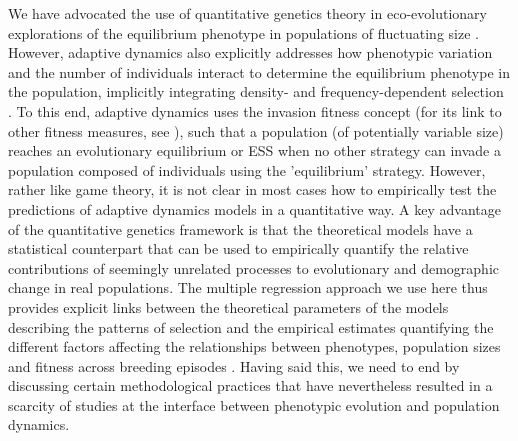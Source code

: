 \documentclass{article}
\begin{document}
We have advocated the use of quantitative genetics theory in eco-evolutionary explorations of the equilibrium phenotype in populations of fluctuating size \citep{Engen2013, Engen2020, Lande2017, Lande2009a}. However, adaptive dynamics also explicitly addresses how phenotypic variation and the number of individuals interact to determine the equilibrium phenotype in the population, implicitly integrating density- and frequency-dependent selection \citep{McGill2007}. To this end, adaptive dynamics uses the invasion fitness concept (for its link to other fitness measures, see \cite{Lehmann2016}), such that a population (of potentially variable size) reaches an evolutionary equilibrium or ESS when no other strategy can invade a population composed of individuals using the 'equilibrium' strategy. However, rather like game theory, it is not clear in most cases how to empirically test the predictions of adaptive dynamics models in a quantitative way. A key advantage of the quantitative genetics framework is that the theoretical models have a statistical counterpart that can be used to empirically quantify the relative contributions of seemingly unrelated processes to evolutionary and demographic change in real populations. The multiple regression approach we use here thus provides explicit links between the theoretical parameters of the models describing the patterns of selection and the empirical estimates quantifying the different factors affecting the relationships between phenotypes, population sizes and fitness across breeding episodes \citep{Lande1983, Queller1992, Wolf1999SocialSelection, Heisler1987, Goodnight1992}. Having said this, we need to end by discussing certain methodological practices that have nevertheless resulted in a scarcity of studies at the interface between phenotypic evolution and population dynamics.
\end{document}
